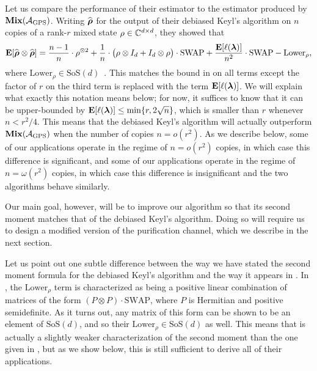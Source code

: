 \documentclass{article}
\newcommand{\mixed}{\textup{\textbf{Mix}}}
\newcommand{\gps}{\calA_{\mathrm{GPS}}}
\newcommand{\symsep}{\mathrm{SoS}}
\newcommand{\swap}{\mathrm{SWAP}}
\begin{document}
Let us compare the performance of their estimator to the estimator produced by $\mixed(\gps)$.
Writing $\widehat{\boldsymbol{\rho}}$ for the output of their debiased Keyl's algorithm on $n$ copies of a rank-$r$ mixed state $\rho \in \mathbb C^{d \times d}$, they showed that
\begin{equation}\label{eq:debiased-keyl-2nd-moment}
    \E[\widehat{\brho} \otimes \widehat{\brho}]
    = \frac{n-1}{n} \cdot \rho^{\otimes 2} + \frac{1}{n} \cdot \big(\rho \otimes I_d + I_d \otimes \rho\big) \cdot \swap + \frac{\E[\ell(\blambda)]}{n^2} \cdot \swap-\mathrm{Lower}_{\rho},
    \end{equation}
where $\mathrm{Lower}_{\rho} \in \symsep(d)$~\cite[Theorem 1.4]{PSW25}.
This matches the bound in  on all terms except the factor of $r$ on the third term is replaced with the term $\mathop{\bf E\/}[\ell(\boldsymbol{\lambda})]$.
We will explain what exactly this notation means below;
for now, it suffices to know that it can be upper-bounded by $\mathop{\bf E\/}[\ell(\boldsymbol{\lambda})] \leq \min\{r, 2\sqrt{n}\}$,
which is smaller than $r$ whenever $n < r^2/4$.
This means that the debiased Keyl's algorithm will actually outperform $\mixed(\gps)$ when the number of copies $n = o(r^2)$.
As we describe below, some of our applications operate in the regime of $n = o(r^2)$ copies, in which case this difference is significant,
and some of our applications operate in the regime of $n = \omega(r^2)$ copies, in which case this difference is insignificant and the two algorithms behave similarly.

Our main goal, however, will be to improve our algorithm so that its second moment matches that of the debiased Keyl's algorithm.
Doing so will require us to design a modified version of the purification channel, which we describe in the next section.

\begin{remark}\label{rem:lower}
    Let us point out one subtle difference between the way we have stated the second moment formula for the debiased Keyl's algorithm and the way it appears in \cite[Theorem 1.4]{PSW25}.
    In \cite{PSW25}, the $\mathrm{Lower}_{\rho}$ term is characterized as being a positive linear combination of matrices of the form $(P \otimes P) \cdot \swap$,
    where $P$ is Hermitian and positive semidefinite.
    As it turns out, any matrix of this form can be shown to be an element of $\symsep(d)$, and so their $\mathrm{Lower}_{\rho} \in \symsep(d)$ as well.
    This means that  is actually a slightly weaker characterization of the second moment than the one given in \cite{PSW25},
    but as we show below, this is still sufficient to derive all of their applications.
\end{remark}
\end{document}
